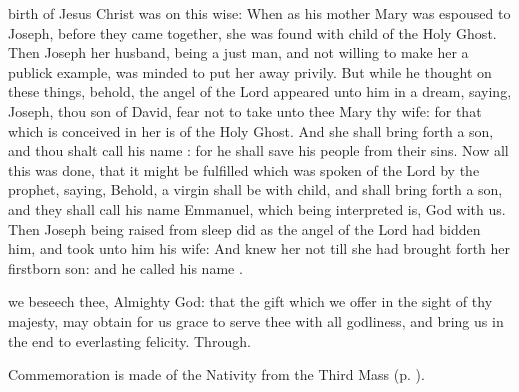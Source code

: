 \vspace{-0.25\baselineskip}

 birth of Jesus Christ was on this wise: When as his mother Mary was espoused to Joseph, before they came together, she was found with child of the Holy Ghost. Then Joseph her husband, being a just man, and not willing to make her a publick example, was minded to put her away privily. But while he thought on these things, behold, the angel of the Lord appeared unto him in a dream, saying, Joseph, thou son of David, fear not to take unto thee Mary thy wife: for that which is conceived in her is of the Holy Ghost. And she shall bring forth a son, and thou shalt call his name : for he shall save his people from their sins. Now all this was done, that it might be fulfilled which was spoken of the Lord by the prophet, saying, Behold, a virgin shall be with child, and shall bring forth a son, and they shall call his name Emmanuel, which being interpreted is, God with us. Then Joseph being raised from sleep did as the angel of the Lord had bidden him, and took unto him his wife: And knew her not till she had brought forth her firstborn son: and he called his name .


\vspace{-1\baselineskip}

\secret
{} we beseech thee, Almighty God: that the gift which we offer in the sight of thy majesty, may obtain for us grace to serve thee with all godliness, and bring us in the end to everlasting felicity. Through.
\begin{rubric}
    Commemoration is made of the Nativity from the Third Mass (p. \pageref{NativityMassIIISecret}).
\end{rubric}


\vspace{-0.5\baselineskip}

\postcommunion

\vspace{-0.1\baselineskip}

